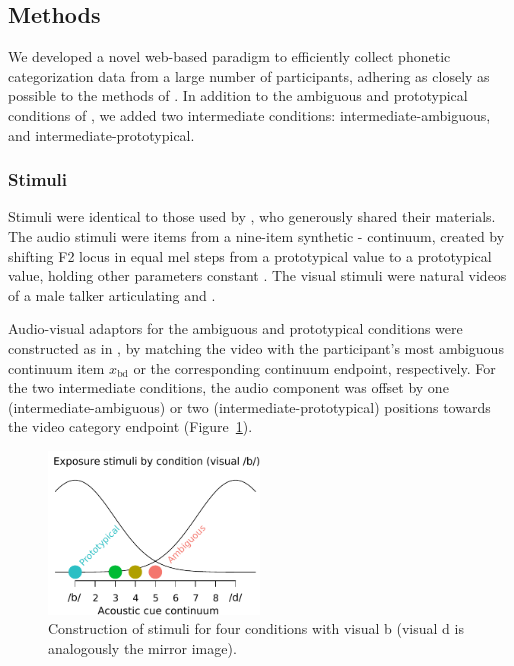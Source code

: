 \subsection{Methods}
\label{sec:methods-4}

We developed a novel web-based paradigm to efficiently collect phonetic categorization data from a large number of participants, adhering as closely as possible to the methods of .  In addition to the ambiguous and prototypical conditions of , we added two intermediate conditions: intermediate-ambiguous, and intermediate-prototypical.

\subsubsection{Stimuli}
\label{sec:stimuli}

Stimuli were identical to those used by , who generously shared their materials.  The audio stimuli were items from a nine-item synthetic - continuum, created by shifting F2 locus in equal mel steps from a prototypical  value to a prototypical  value, holding other parameters constant \cite{Vroomen2004}.  The visual stimuli were natural videos of a male talker articulating  and .

Audio-visual adaptors for the ambiguous and prototypical conditions were constructed as in , by matching the video with the participant's most ambiguous continuum item $x_\mathrm{bd}$ or the corresponding continuum endpoint, respectively.  For the two intermediate conditions, the audio component was offset by one (intermediate-ambiguous) or two (intermediate-prototypical) positions towards the video category endpoint (Figure~\ref{fig:conditions-schematic}).

\begin{figure}[htb]
  \centering
  \includegraphics[width=0.5\textwidth]{figs/schematic-conditions-modified.pdf}
  \caption{Construction of stimuli for four conditions with visual \ph b (visual \ph d is analogously the mirror image).}
  \label{fig:conditions-schematic}
\end{figure}

